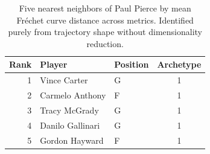 \begin{table}[htbp]
  \centering\small
  \begin{tabular}{rllc}
    \toprule
    Rank & Player & Position & Archetype \\
    \midrule
    1 & Vince Carter & G & 1 \\
    2 & Carmelo Anthony & F & 1 \\
    3 & Tracy McGrady & G & 1 \\
    4 & Danilo Gallinari & G & 1 \\
    5 & Gordon Hayward & F & 1 \\
    \bottomrule
  \end{tabular}
  \caption{Five nearest neighbors of Paul Pierce by mean Fr\'{e}chet curve distance across metrics. Identified purely from trajectory shape without dimensionality reduction.}
  \label{tab:Paul_Pierce_frechet_curve_neighbors}
\end{table}

